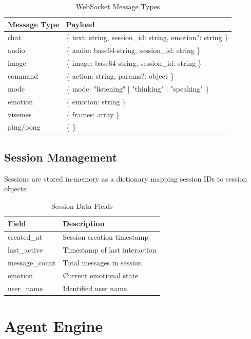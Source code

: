 \documentclass[12pt,a4paper,twoside]{report}
\begin{document}
\begin{table}[H]
\centering
\begin{tabularx}{\textwidth}{|l|X|}
\hline
\rowcolor{phiblue!20}
\textbf{Message Type} & \textbf{Payload} \\
\hline
chat & \{ text: string, session\_id: string, emotion?: string \} \\
\hline
audio & \{ audio: base64-string, session\_id: string \} \\
\hline
image & \{ image: base64-string, session\_id: string \} \\
\hline
command & \{ action: string, params?: object \} \\
\hline
mode & \{ mode: "listening" | "thinking" | "speaking" \} \\
\hline
emotion & \{ emotion: string \} \\
\hline
visemes & \{ frames: array \} \\
\hline
ping/pong & \{ \} \\
\hline
\end{tabularx}
\caption{WebSocket Message Types}
\end{table}

\subsection{Session Management}

Sessions are stored in-memory as a dictionary mapping session IDs to session objects:

\begin{table}[H]
\centering
{}
\begin{tabularx}{\textwidth}{|l|X|}
\hline
\rowcolor{phiblue!20}
\textbf{Field} & \textbf{Description} \\
\hline
created\_at & Session creation timestamp \\
\hline
last\_active & Timestamp of last interaction \\
\hline
message\_count & Total messages in session \\
\hline
emotion & Current emotional state \\
\hline
user\_name & Identified user name \\
\hline
\end{tabularx}
\caption{Session Data Fields}
\end{table}

\section{Agent Engine}
\end{document}

